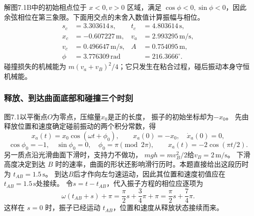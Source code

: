 \documentclass[UTF8,fontset=fandol,a4paper,11pt]{ctexart}
\newcommand{\figcaption}[1]{\par\vspace{2pt}{\small\color{muted}#1}\par}
\begin{document}
\begin{center}\begin{minipage}{\linewidth}\centering{}\figcaption{解图 7.1B}\end{minipage}\end{center}
解图7.1B中的初始相点位于 $x<0,v>0$ 区域，满足 $\cos\phi<0,\sin\phi<0$，因此余弦相位在第三象限。下面用交点的未舍入数值计算振幅与相位。
\[\begin{aligned}s_c&=3.303614\,\mathrm s,&t_c&=4.803614\,\mathrm s,\\x_c&=-0.607227\,\mathrm m,&v_a&=2.993295\,\mathrm{m/s},\\v_c&=0.496647\,\mathrm{m/s},&A&=0.754095\,\mathrm m,\\\phi&=3.776309\,\mathrm{rad}& &=216.3666^\circ.\end{aligned}\]
碰撞损失的机械能为 $m(v_a+v_B)^2/4$；它只发生在粘合过程，碰后振动本身守恒机械能。
\subsubsection*{释放、到达曲面底部和碰撞三个时刻}
图7.1以平衡点$O$为零点，压缩量$x_0$是正的长度，
振子的初始坐标却为$-x_0$。
先由释放位置和速度确定碰前振动的两个积分常数，得
\[
x_a(t)=x_0\cos(\omega t+\phi_0),\qquad
x_a(0)=-x_0,\quad\dot x_a(0)=0,
\]
\[
\cos\phi_0=-1,\quad\sin\phi_0=0,
\quad\phi_0=\pi\pmod{2\pi},\qquad
x_a(t)=-2\cos(\pi t/2).
\]
另一质点沿光滑曲面下滑时，支持力不做功，
$mgh=mv_B^2/2$给$v_B=2\,\mathrm{m/s}$。
下滑高度决定到达 $B$ 时的速率，曲面的形状还影响滑行历时。本题直接给出这段历时为 $t_{AB}=1.5\,\mathrm s$。
到达$B$后才作向左匀速运动，因此其位置和速度初值应在$t_{AB}=1.5\,\mathrm s$处接续。
令$s=t-t_{AB}$，代入振子方程的相位应逐项为
\[
\omega(t_{AB}+s)+\pi
=\frac\pi2s+\frac34\pi+\pi
=\frac\pi2s+\frac74\pi.
\]
这样在 $s=0$ 时，振子已经运动 $t_{AB}$，位置和速度从释放状态接续而来。
\end{document}
